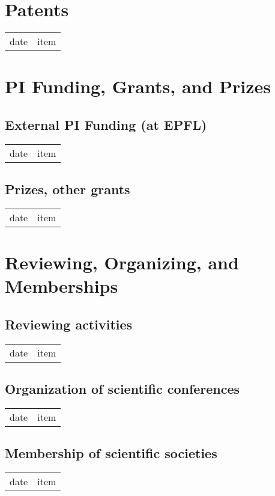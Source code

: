 \section{Patents}
\begin{tabular}[l]{ p{} p{} }
date & item\\
\end{tabular} 

\section{PI Funding, Grants, and Prizes}

\subsection{External PI Funding (at EPFL)}
\begin{tabular}[l]{ p{} p{} }
date & item\\
\end{tabular} 

\subsection{Prizes, other grants}
\begin{tabular}[l]{ p{} p{} }
date & item\\
\end{tabular} 
\section{Reviewing, Organizing, and Memberships
}	
\subsection{Reviewing activities}
\begin{tabular}[l]{ p{} p{} }
date & item\\
\end{tabular} 

\subsection{Organization of scientific conferences}
\begin{tabular}[l]{ p{} p{} }
date & item\\
\end{tabular} 

\subsection{Membership of scientific societies}
\begin{tabular}[l]{ p{} p{} }
date & item\\
\end{tabular} 